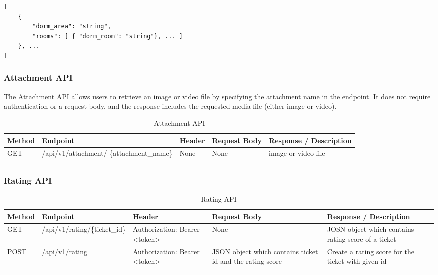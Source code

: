 \begin{lstlisting}[breaklines=true, caption=Dormitory Scheme]
[
	{
		"dorm_area": "string",
		"rooms": [ { "dorm_room": "string"}, ... ]
	}, ...
]
\end{lstlisting}



\subsubsection{Attachment API}
The Attachment API allows users to retrieve an image or video file by specifying the attachment name in the endpoint. It does not require authentication or a request body, and the response includes the requested media file (either image or video).
\begin{longtable}{|m{1.6cm}|m{5cm}|m{3cm}|m{3cm}|m{3.2cm}|}
	\hline
	\textbf{Method} & \textbf{Endpoint} & \textbf{Header}                                                                                                                            & \textbf{Request Body} & \textbf{Response / Description}   \\ \hline
	\endhead
	
	GET & /api/v1/attachment/ \newline \{attachment\_name\} & None & None & image or video file \\ \hline
	
	
	\caption{Attachment API}
	\label{tab:attachment-api}
	
\end{longtable}



\subsubsection{Rating API}

\begin{longtable}{|m{1.6cm}|m{5cm}|m{3cm}|m{3cm}|m{3.2cm}|}
	\hline
	\textbf{Method} & \textbf{Endpoint} & \textbf{Header}                                                                                                                            & \textbf{Request Body} & \textbf{Response / Description}   \\ \hline
	\endhead
	
	GET & /api/v1/rating/\{ticket\_id\} & Authorization: Bearer <token>  & None & JOSN object which contains rating score of a ticket\\ \hline
	
	POST & /api/v1/rating & Authorization: Bearer <token>  & JSON object which contains ticket id and the rating score & Create a rating score for the ticket with given id\\ \hline
	
	
	\caption{Rating API}
	\label{tab:rating-api}
	
\end{longtable}



